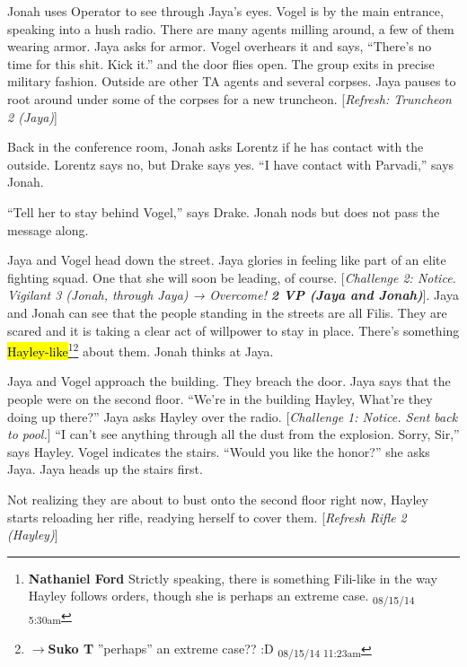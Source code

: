 Jonah uses Operator to see through Jaya's eyes.  Vogel is by the main entrance, speaking into a hush radio.  There are many agents milling around, a few of them wearing armor.  Jaya asks for armor.  Vogel overhears it and says, ``There's no time for this shit.  Kick it.'' and the door flies open.  The group exits in precise military fashion.  Outside are other TA agents and several corpses.  Jaya pauses to root around under some of the corpses for a new truncheon.  {[}\textit{Refresh: Truncheon 2 (Jaya)}{]}



Back in the conference room, Jonah asks Lorentz if he has contact with the outside.  Lorentz says no, but Drake says yes.  ``I have contact with Parvadi,'' says Jonah.  

``Tell her to stay behind Vogel,'' says Drake.   Jonah nods but does not pass the message along.



Jaya and Vogel head down the street.  Jaya glories in feeling like part of an elite fighting squad.  One that she will soon be leading, of course. {[}\textit{Challenge 2: Notice.  Vigilant 3 (Jonah, through Jaya) → Overcome! }\textit{\textbf{2 VP (Jaya and Jonah)}}{]}.  Jaya and Jonah can see that the people standing in the streets are all Filis.  They are scared and it is taking a clear act of willpower to stay in place.  There's something \hl{Hayley-like}\footnote{\textbf{Nathaniel Ford }Strictly speaking, there is something Fili-like in the way Hayley follows orders, though she is perhaps an extreme case. \textsubscript{08/15/14 5:30am}}\footnote{$\rightarrow$\textbf{Suko T }''perhaps'' an extreme case?? :D \textsubscript{08/15/14 11:23am}} about them.     Jonah thinks at Jaya.



Jaya and Vogel approach the building.  They breach the door.  Jaya says that the people were on the second floor.  ``We're in the building Hayley, What're they doing up there?'' Jaya asks Hayley over the radio.   {[}\textit{Challenge 1: Notice.  Sent back to pool.}{]}  ``I can't see anything through all the dust from the explosion.  Sorry, Sir,'' says Hayley.   Vogel indicates the stairs.  ``Would you like the honor?'' she asks Jaya.  Jaya heads up the stairs first.



Not realizing they are about to bust onto the second floor right now, Hayley starts reloading her rifle, readying herself to cover them.  {[}\textit{Refresh Rifle 2 (Hayley)}{]}



